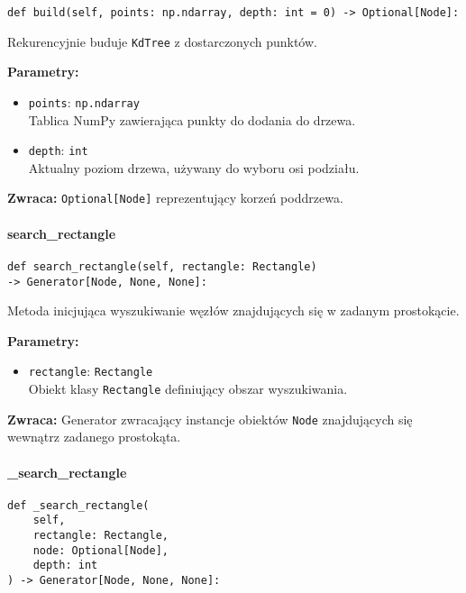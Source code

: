 \documentclass[12pt]{article}
\begin{document}
\begin{verbatim}
def build(self, points: np.ndarray, depth: int = 0) -> Optional[Node]:
\end{verbatim}

\noindent Rekurencyjnie buduje \texttt{KdTree} z dostarczonych punktów.

\noindent\textbf{Parametry:}
\begin{itemize}
    \item \texttt{points}: \texttt{np.ndarray} \\
    Tablica NumPy zawierająca punkty do dodania do drzewa.
    \item \texttt{depth}: \texttt{int} \\
    Aktualny poziom drzewa, używany do wyboru osi podziału.
\end{itemize}

\textbf{Zwraca:} 
\texttt{Optional[Node]} reprezentujący korzeń poddrzewa.

\paragraph{search\_rectangle}

\begin{verbatim}
def search_rectangle(self, rectangle: Rectangle) 
-> Generator[Node, None, None]:
\end{verbatim}

\noindent Metoda inicjująca wyszukiwanie węzłów znajdujących się w zadanym prostokącie.

\noindent\textbf{Parametry:}
\begin{itemize}
    \item \texttt{rectangle}: \texttt{Rectangle} \\
    Obiekt klasy \texttt{Rectangle} definiujący obszar wyszukiwania.
\end{itemize}

\textbf{Zwraca:} 
Generator zwracający instancje obiektów \texttt{Node} znajdujących się wewnątrz zadanego prostokąta.

\paragraph{\_search\_rectangle}

\begin{verbatim}
def _search_rectangle(
    self,
    rectangle: Rectangle,
    node: Optional[Node],
    depth: int
) -> Generator[Node, None, None]:
\end{verbatim}
\end{document}
